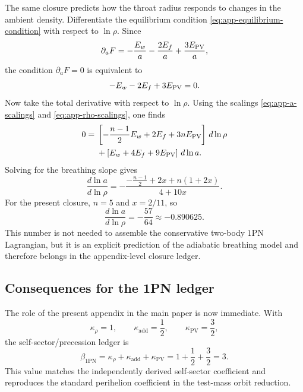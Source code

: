 \documentclass[11pt]{article}
\newcommand{\kadd}{\kappa_{\mathrm{add}}}
\newcommand{\kPV}{\kappa_{\mathrm{PV}}}
\newcommand{\krho}{\kappa_{\rho}}
\newcommand{\betaPN}{\beta_{\mathrm{1PN}}}
\begin{document}
The same closure predicts how the throat radius responds to changes in the ambient
density. Differentiate the equilibrium condition
\eqref{eq:app-equilibrium-condition} with respect to \(\ln\rho\). Since
\begin{equation}
\partial_a F
=
-\frac{E_w}{a}
-\frac{2E_f}{a}
+\frac{3E_{\rm PV}}{a},
\end{equation}
the condition \(\partial_a F=0\) is equivalent to
\begin{equation}
-E_w-2E_f+3E_{\rm PV}=0.
\label{eq:app-equilibrium-rewritten}
\end{equation}
Now take the total derivative with respect to \(\ln\rho\). Using the scalings
\eqref{eq:app-a-scalings} and \eqref{eq:app-rho-scalings}, one finds
\begin{align}
0
={}&
\left[
-\frac{n-1}{2}E_w + 2E_f + 3nE_{\rm PV}
\right]\,d\ln\rho
\nonumber\\
&
+
\left[
E_w+4E_f+9E_{\rm PV}
\right]\,d\ln a.
\label{eq:app-differentiated-equilibrium}
\end{align}
Solving for the breathing slope gives
\begin{equation}
\boxed{
\frac{d\ln a}{d\ln\rho}
=
-
\frac{-\frac{n-1}{2} + 2x + n(1+2x)}{4+10x}.
}
\label{eq:app-dlna-general}
\end{equation}
For the present closure, \(n=5\) and \(x=2/11\), so
\begin{equation}
\boxed{
\frac{d\ln a}{d\ln\rho}
=
-\frac{57}{64}
\approx -0.890625.
}
\label{eq:app-dlna-57-64}
\end{equation}
This number is not needed to assemble the conservative two-body \(1\)PN Lagrangian, but
it is an explicit prediction of the adiabatic breathing model and therefore belongs in the
appendix-level closure ledger.

\subsection{Consequences for the 1PN ledger}
\label{app:adiabatic-ledger}

The role of the present appendix in the main paper is now immediate. With
\begin{equation}
\krho=1,
\qquad
\kadd=\frac12,
\qquad
\kPV=\frac32,
\end{equation}
the self-sector/precession ledger is
\begin{equation}
\boxed{
\betaPN
=
\krho+\kadd+\kPV
=
1+\frac12+\frac32
=
3.
}
\label{eq:app-beta-three}
\end{equation}
This value matches the independently derived self-sector coefficient and reproduces the
standard perihelion coefficient in the test-mass orbit reduction.
\end{document}
